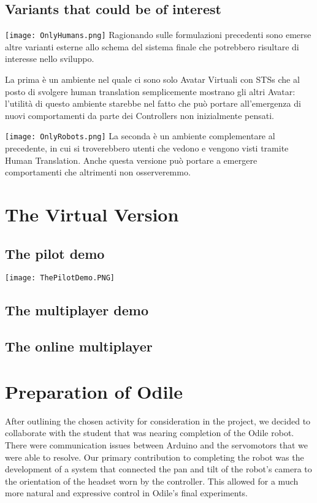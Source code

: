 \documentclass{Configuration_Files/PoliMi3i_thesis}
\begin{document}
\subsection{Variants that could be of interest}
\texttt{[image: OnlyHumans.png]}
Ragionando sulle formulazioni precedenti sono emerse altre varianti esterne allo schema del sistema finale che potrebbero risultare di interesse nello sviluppo.

La prima è un ambiente nel quale ci sono solo Avatar Virtuali con STSs che al posto di svolgere human translation semplicemente mostrano gli altri Avatar: l’utilità di questo ambiente starebbe nel fatto che può portare all’emergenza di nuovi comportamenti da parte dei Controllers non inizialmente pensati.

\texttt{[image: OnlyRobots.png]}
La seconda è un ambiente complementare al precedente, in cui si troverebbero utenti che vedono e vengono visti tramite Human Translation. Anche questa versione può portare a emergere comportamenti che altrimenti non osserveremmo.

\section{The Virtual Version}

\subsection{The pilot demo}
\texttt{[image: ThePilotDemo.PNG]}

\subsection{The multiplayer demo}

\subsection{The online multiplayer}


\section{Preparation of Odile}

After outlining the chosen activity for consideration in the project, we decided to collaborate with the student that was nearing completion of the Odile robot. There were communication issues between Arduino and the servomotors that we were able to resolve. Our primary contribution to completing the robot was the development of a system that connected the pan and tilt of the robot's camera to the orientation of the headset worn by the controller. This allowed for a much more natural and expressive control in Odile's final experiments.
\end{document}
